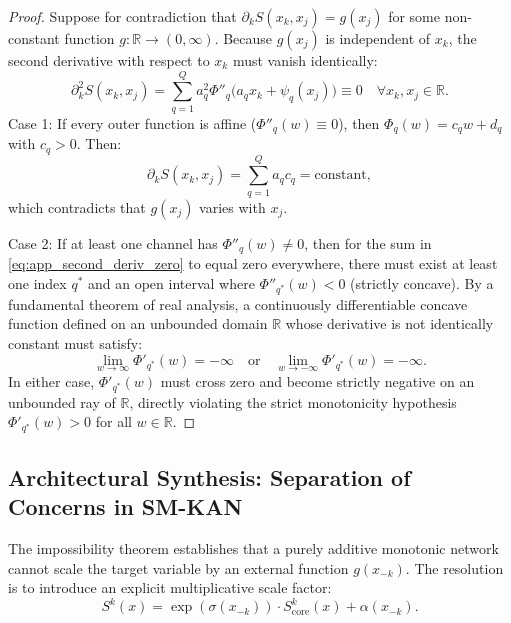 \documentclass[11pt,a4paper]{article}
\theoremstyle{plain}
\theoremstyle{definition}
\theoremstyle{remark}
\begin{document}
\begin{proof}
Suppose for contradiction that $\partial_k S(x_k, x_j) = g(x_j)$ for some non-constant function $g: \mathbb{R} \to (0, \infty)$.
Because $g(x_j)$ is independent of $x_k$, the second derivative with respect to $x_k$ must vanish identically:
\begin{equation}
    \partial_k^2 S(x_k, x_j) = \sum_{q=1}^Q a_q^2 \Phi''_q\Big( a_q x_k + \psi_q(x_j) \Big) \equiv 0 \quad \forall x_k, x_j \in \mathbb{R}.
    \label{eq:app_second_deriv_zero}
\end{equation}
Case 1: If every outer function is affine ($\Phi''_q(w) \equiv 0$), then $\Phi_q(w) = c_q w + d_q$ with $c_q > 0$. Then:
\begin{equation}
    \partial_k S(x_k, x_j) = \sum_{q=1}^Q a_q c_q = \text{constant},
\end{equation}
which contradicts that $g(x_j)$ varies with $x_j$.

Case 2: If at least one channel has $\Phi''_q(w) \neq 0$, then for the sum in \eqref{eq:app_second_deriv_zero} to equal zero everywhere, there must exist at least one index $q^*$ and an open interval where $\Phi''_{q^*}(w) < 0$ (strictly concave). 
By a fundamental theorem of real analysis, a continuously differentiable concave function defined on an unbounded domain $\mathbb{R}$ whose derivative is not identically constant must satisfy:
\begin{equation}
    \lim_{w \to \infty} \Phi'_{q^*}(w) = -\infty \quad \text{or} \quad \lim_{w \to -\infty} \Phi'_{q^*}(w) = -\infty.
\end{equation}
In either case, $\Phi'_{q^*}(w)$ must cross zero and become strictly negative on an unbounded ray of $\mathbb{R}$, directly violating the strict monotonicity hypothesis $\Phi'_{q^*}(w) > 0$ for all $w \in \mathbb{R}$.
\end{proof}

\subsection{Architectural Synthesis: Separation of Concerns in SM-KAN}

The impossibility theorem establishes that a purely additive monotonic network cannot scale the target variable by an external function $g(x_{-k})$. The resolution is to introduce an explicit multiplicative scale factor:
\begin{equation}
    S^k(x) = \exp\left( \sigma(x_{-k}) \right) \cdot S^k_{\text{core}}(x) + \alpha(x_{-k}).
\end{equation}
\end{document}
